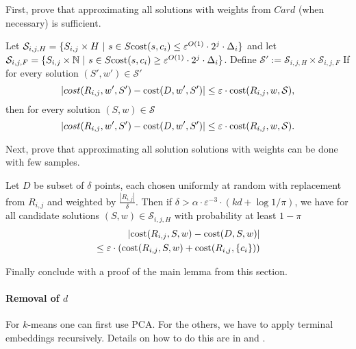 First, prove that approximating all solutions with weights from $Card$ (when necessary) is sufficient.
\begin{lemma}
Let $\mathcal{S}_{i,j,H}= \{S_{i,j}\times H~|~s\in S\text{cost}(s,c_i)\leq \varepsilon^{O(1)}\cdot 2^j\cdot \Delta_i\}$ and let $\mathcal{S}_{i,j,F} =\{S_{i,j}\times \mathbb{N}~|~s\in S\text{cost}(s,c_i)\geq \varepsilon^{O(1)}\cdot 2^j\cdot \Delta_i\} $. Define $\mathcal{S'}:=\mathcal{S}_{i,j,H}\times \mathcal{S}_{i,j,F}$
If for every solution $(S',w')\in \mathcal{S'}$
$$ |cost(R_{i,j},w',S') - \text{cost}(D,w',S')|\leq \varepsilon\cdot \text{cost}(R_{i,j},w,\mathcal{S}),$$ then for every solution $(S,w)\in \mathcal{S}$ 
$$|cost(R_{i,j},w',S') - \text{cost}(D,w',S')|\leq \varepsilon\cdot \text{cost}(R_{i,j},w,\mathcal{S}).$$
\end{lemma}

Next, prove that approximating all solution solutions with weights can be done with few samples.

\begin{lemma}
Let $D$ be subset of $\delta$ points, each chosen uniformly at random with replacement from $R_{i,j}$ and weighted by $\frac{|R_{i,j}|}{\delta}$. Then if $\delta > \alpha\cdot \varepsilon^{-3}\cdot (kd + \log 1/\pi)$, we have for all candidate solutions $(S,w)\in \mathcal{S}_{i,j,H}$ with probability at least $1-\pi$
\begin{eqnarray*}
|\text{cost}(R_{i,j},S,w)-\text{cost}(D,S,w)|\\
\leq \varepsilon\cdot \left(\text{cost}(R_{i,j},S,w) + \text{cost}(R_{i,j},\{c_i\})\right)
\end{eqnarray*}
\end{lemma}

Finally conclude with a proof of the main lemma from this section.

\paragraph{Removal of $d$}

For $k$-means one can first use PCA. For the others, we have to apply terminal embeddings recursively. Details on how to do this are in \cite{stoc} and \cite{braverman2021coresets}.